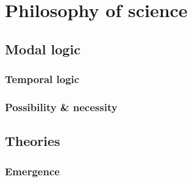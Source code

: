 \chapter{Philosophy of science}

    \minitoc

\section{Modal logic}
\subsection{Temporal logic}

\subsection{Possibility \& necessity}

\section{Theories}
\subsection{Emergence}